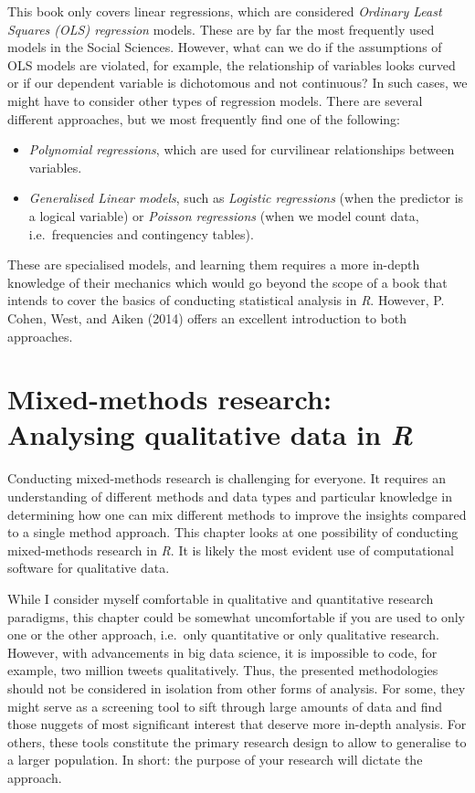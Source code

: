 \documentclass[
  letterpaper,
]{krantz}
\begin{document}
This book only covers linear regressions, which are considered
\emph{Ordinary Least Squares (OLS) regression} models. These are by far
the most frequently used models in the Social Sciences. However, what
can we do if the assumptions of OLS models are violated, for example,
the relationship of variables looks curved or if our dependent variable
is dichotomous and not continuous? In such cases, we might have to
consider other types of regression models. There are several different
approaches, but we most frequently find one of the following:

\begin{itemize}
\item
  \emph{Polynomial regressions}, which are used for curvilinear
  relationships between variables.
\item
  \emph{Generalised Linear models}, such as \emph{Logistic regressions}
  (when the predictor is a logical variable) or \emph{Poisson
  regressions} (when we model count data, i.e.~frequencies and
  contingency tables).
\end{itemize}

These are specialised models, and learning them requires a more in-depth
knowledge of their mechanics which would go beyond the scope of a book
that intends to cover the basics of conducting statistical analysis in
\emph{R}. However, P. Cohen, West, and Aiken (2014) offers an excellent
introduction to both approaches.


\chapter{\texorpdfstring{Mixed-methods research: Analysing qualitative
data in
\emph{R}}{Mixed-methods research: Analysing qualitative data in R}}\label{sec-mixed-methods-research}

Conducting mixed-methods research is challenging for everyone. It
requires an understanding of different methods and data types and
particular knowledge in determining how one can mix different methods to
improve the insights compared to a single method approach. This chapter
looks at one possibility of conducting mixed-methods research in
\emph{R}. It is likely the most evident use of computational software
for qualitative data.

While I consider myself comfortable in qualitative and quantitative
research paradigms, this chapter could be somewhat uncomfortable if you
are used to only one or the other approach, i.e.~only quantitative or
only qualitative research. However, with advancements in big data
science, it is impossible to code, for example, two million tweets
qualitatively. Thus, the presented methodologies should not be
considered in isolation from other forms of analysis. For some, they
might serve as a screening tool to sift through large amounts of data
and find those nuggets of most significant interest that deserve more
in-depth analysis. For others, these tools constitute the primary
research design to allow to generalise to a larger population. In short:
the purpose of your research will dictate the approach.
\end{document}
